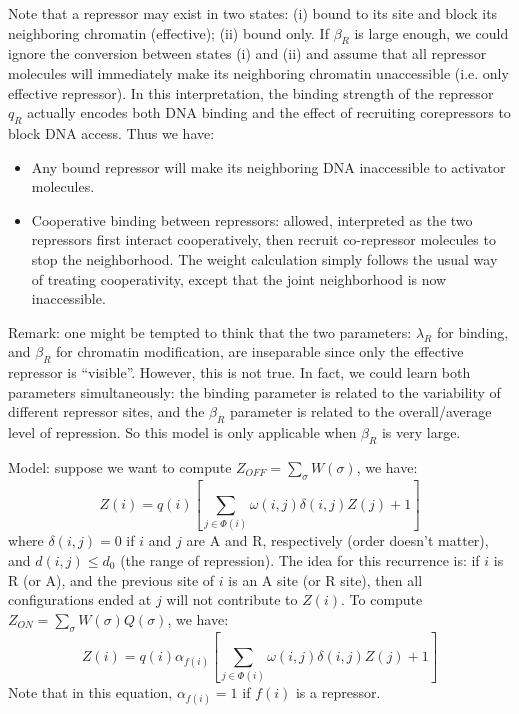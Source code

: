 \documentclass[11pt]{article}
\begin{document}
\begin{enumerate}
\begin{enumerate}
Note that a repressor may exist in two states: (i) bound to its site and block its neighboring chromatin (effective); (ii) bound only. If $\beta_R$ is large enough, we could ignore the conversion between states (i) and (ii) and assume that all repressor molecules will immediately make its neighboring chromatin unaccessible (i.e. only effective repressor). In this interpretation, the binding strength of the repressor $q_R$ actually encodes both DNA binding and the effect of recruiting corepressors to block DNA access. Thus we have: 
\begin{itemize}
\item Any bound repressor will make its neighboring DNA inaccessible to activator molecules. 
\item Cooperative binding between repressors: allowed, interpreted as the two repressors first interact cooperatively, then recruit co-repressor molecules to stop the neighborhood. The weight calculation simply follows the usual way of treating cooperativity, except that the joint neighborhood is now inaccessible. 
\end{itemize}

Remark: one might be tempted to think that the two parameters: $\lambda_R$ for binding, and $\beta_R$ for chromatin modification, are inseparable since only the effective repressor is ``visible''. However, this is not true. In fact, we could learn both parameters simultaneously: the binding parameter is related to the variability of different repressor sites, and the $\beta_R$ parameter is related to the overall/average level of repression. So this model is only applicable when $\beta_R$ is very large. 

Model: suppose we want to compute $Z_{OFF} = \sum_{\sigma} W(\sigma)$, we have: 
\begin{equation}
Z(i) = q(i) \left[ \sum_{j \in \Phi(i)}\omega(i,j) \delta(i,j)Z(j) + 1	\right]
\end{equation}
where $\delta(i,j) = 0$ if $i$ and $j$ are A and R, respectively (order doesn't matter), and $d(i,j) \leq d_0$ (the range of repression). The idea for this recurrence is: if $i$ is R (or A), and the previous site of $i$ is an A site (or R site), then all configurations ended at $j$ will not contribute to $Z(i)$. To compute $Z_{ON} = \sum_{\sigma} W(\sigma) Q(\sigma)$, we have: 
\begin{equation}
Z(i) = q(i) \alpha_{f(i)} \left[ \sum_{j \in \Phi(i)}\omega(i,j) \delta(i,j)Z(j) + 1	\right]
\end{equation}
Note that in this equation, $\alpha_{f(i)} = 1$ if $f(i)$ is a repressor. 


\end{enumerate}
\end{enumerate}
\end{document}
